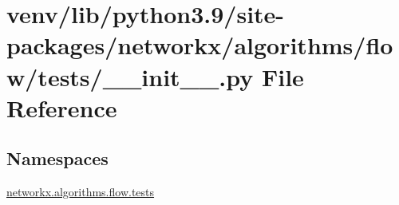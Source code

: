 \hypertarget{venv_2lib_2python3_89_2site-packages_2networkx_2algorithms_2flow_2tests_2____init_____8py}{}\section{venv/lib/python3.9/site-\/packages/networkx/algorithms/flow/tests/\+\_\+\+\_\+init\+\_\+\+\_\+.py File Reference}
\label{venv_2lib_2python3_89_2site-packages_2networkx_2algorithms_2flow_2tests_2____init_____8py}
\subsection*{Namespaces}
\begin{DoxyCompactItemize}
\item 
 \hyperlink{namespacenetworkx_1_1algorithms_1_1flow_1_1tests}{networkx.\+algorithms.\+flow.\+tests}
\end{DoxyCompactItemize}

